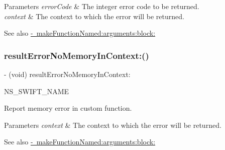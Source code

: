 \begin{DoxyParams}{Parameters}
{\em error\+Code} & The integer error code to be returned. \\
\hline
{\em context} & The context to which the error will be returned.\\
\hline
\end{DoxyParams}
\begin{DoxySeeAlso}{See also}
\mbox{\hyperlink{interface_o_p_t_l_y_f_m_d_b_database_af2c3e10041c8d0a95e2feb84a2ffa645}{-\/ make\+Function\+Named\+:arguments\+:block\+:}} 
\end{DoxySeeAlso}
\mbox{\label{interface_o_p_t_l_y_f_m_d_b_database_a664d742e398dd193a735e287b8a32435}} 
\subsubsection{\texorpdfstring{result\+Error\+No\+Memory\+In\+Context\+:()}{resultErrorNoMemoryInContext:()}}
{\footnotesize\ttfamily -\/ (void) result\+Error\+No\+Memory\+In\+Context\+: \begin{DoxyParamCaption}\item[{(result\+Error\+No\+Memory(context\+:))}]{N\+S\+\_\+\+S\+W\+I\+F\+T\+\_\+\+N\+A\+ME }\end{DoxyParamCaption}}

Report memory error in custom function.


\begin{DoxyParams}{Parameters}
{\em context} & The context to which the error will be returned.\\
\hline
\end{DoxyParams}
\begin{DoxySeeAlso}{See also}
\mbox{\hyperlink{interface_o_p_t_l_y_f_m_d_b_database_af2c3e10041c8d0a95e2feb84a2ffa645}{-\/ make\+Function\+Named\+:arguments\+:block\+:}} 
\end{DoxySeeAlso}
\mbox{\label{interface_o_p_t_l_y_f_m_d_b_database_ac51aeb563e8af7a9f9ee4dd562c083d8}} 
